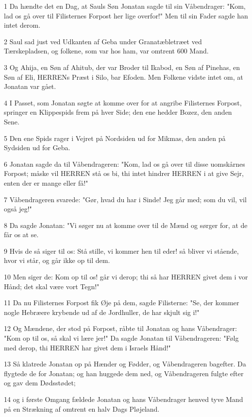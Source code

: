 \par 1 Da hændte det en Dag, at Sauls Søn Jonatan sagde til sin Våbendrager: "Kom, lad os gå over til Filisternes Forpost her lige overfor!" Men til sin Fader sagde han intet derom.
\par 2 Saul sad just ved Udkanten af Geba under Granatæbletræet ved Tærskepladsen, og folkene, som var hos ham, var omtrent 600 Mand.
\par 3 Og Ahija, en Søn af Ahitub, der var Broder til Ikabod, en Søn af Pinehas, en Søn af Eli, HERRENs Præst i Silo, bar Efoden. Men Folkene vidste intet om, at Jonatan var gået.
\par 4 I Passet, som Jonatan søgte at komme over for at angribe Filisternes Forpost, springer en Klippespids frem på hver Side; den ene hedder Bozez, den anden Sene.
\par 5 Den ene Spids rager i Vejret på Nordsiden ud for Mikmas, den anden på Sydsiden ud for Geba.
\par 6 Jonatan sagde da til Våbendrageren: "Kom, lad os gå over til disse uomskårnes Forpost; måske vil HERREN stå os bi, thi intet hindrer HERREN i at give Sejr, enten der er mange eller få!"
\par 7 Våbendrageren svarede: "Gør, hvad du har i Sinde! Jeg går med; som du vil, vil også jeg!"
\par 8 Da sagde Jonatan: "Vi søger nu at komme over til de Mænd og sørger for, at de får os at se.
\par 9 Hvis de så siger til os: Stå stille, vi kommer hen til eder! så bliver vi stående, hvor vi står, og går ikke op til dem.
\par 10 Men siger de: Kom op til os! går vi derop; thi så har HERREN givet dem i vor Hånd; det skal være vort Tegn!"
\par 11 Da nu Filisternes Forpost fik Øje på dem, sagde Filisterne: "Se, der kommer nogle Hebræere krybende ud af de Jordhuller, de har skjult sig i!"
\par 12 Og Mændene, der stod på Forpost, råbte til Jonatan og hans Våbendrager: "Kom op til os, så skal vi lære jer!" Da sagde Jonatan til Våbendrageren: "Følg med derop, thi HERREN har givet dem i Israels Hånd!"
\par 13 Så klatrede Jonatan op på Hænder og Fødder, og Våbendrageren bagefter. Da flygtede de for Jonatan; og han huggede dem ned, og Våbendrageren fulgte efter og gav dem Dødsstødet;
\par 14 og i første Omgang fældede Jonatan og hans Våbendrager henved tyve Mand på en Strækning af omtrent en halv Dags Pløjeland.
